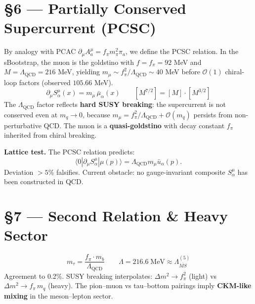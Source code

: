 \documentclass[11pt,a4paper]{article}
\newcommand{\Lqcd}{\Lambda_{\text{QCD}}}
\newcommand{\fpi}{f_\pi}
\newcommand{\mpi}{m_\pi}
\newcommand{\mmu}{m_\mu}
\newcommand{\mtau}{m_\tau}
\begin{document}
\section*{\S 6 --- Partially Conserved Supercurrent (PCSC)}

By analogy with PCAC $\partial_\mu A^\mu_a = \fpi \mpi^2 \pi_a$, we define the PCSC relation.  In the sBootstrap, the muon is the goldstino with $f=\fpi=92$ MeV and $M=\Lqcd=216$ MeV, yielding $\mmu \sim \fpi^2/\Lqcd \sim 40$ MeV before $\mathcal{O}(1)$ chiral-loop factors (observed $105.66$ MeV).
\begin{equation}
\boxed{\partial_\mu S^\mu_\alpha(x) = \mmu\,\bar{\mu}_\alpha(x)} \qquad [M^{7/2}] = [M] \cdot [M^{3/2}]
\end{equation}
The $\Lqcd$ factor reflects \textbf{hard SUSY breaking}: the supercurrent is not conserved even at $m_q \to 0$, because $\mmu = \fpi^2/\Lqcd + \mathcal{O}(m_q)$ persists from non-perturbative QCD.  The muon is a \textbf{quasi-goldstino} with decay constant $\fpi$ inherited from chiral breaking.

\textbf{Lattice test.}  The PCSC relation predicts:
\begin{equation}
\langle 0 | \partial_\mu S^\mu_\alpha | \mu(p) \rangle = \Lqcd \mmu \bar{u}_\alpha(p).
\end{equation}
Deviation ${>}5\%$ falsifies.  Current obstacle: no gauge-invariant composite $S^\mu_\alpha$ has been constructed in QCD.

\section*{\S 7 --- Second Relation \& Heavy Sector}

\begin{equation}
\boxed{\mtau = \frac{\fpi \cdot m_b}{\Lqcd}} \qquad \Lambda = 216.6\;\text{MeV} \approx \Lambda_{\overline{MS}}^{(5)}
\end{equation}
Agreement to 0.2\%.  SUSY breaking interpolates: $\Delta m^2 \to \fpi^2$ (light) vs $\Delta m^2 \to \fpi\,m_q$ (heavy).  The pion--muon vs tau--bottom pairings imply \textbf{CKM-like mixing} in the meson--lepton sector.

\end{document}
